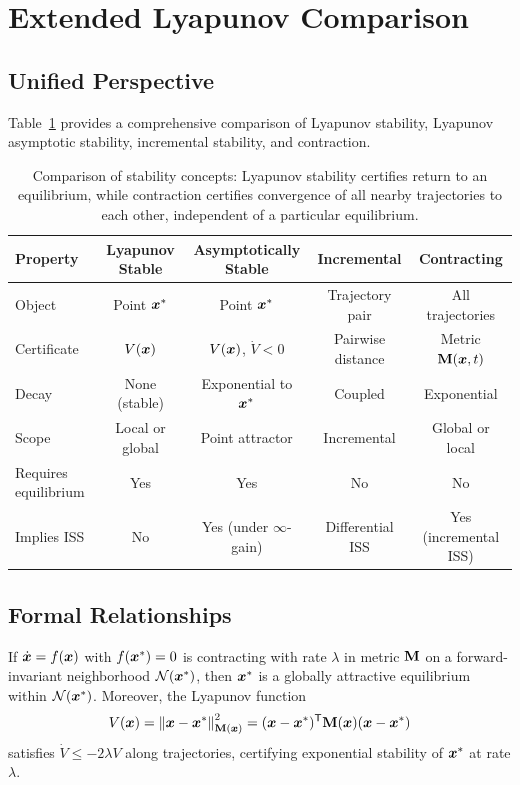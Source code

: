 \section{Extended Lyapunov Comparison}

\subsection{Unified Perspective}

Table~\ref{tbl:ch4:lyapunov-contraction} provides a comprehensive comparison of Lyapunov
stability, Lyapunov asymptotic stability, incremental stability, and contraction.

\begin{table}[h!]
\centering
\small
\begin{tabular}{@{}lcccc@{}}
\toprule
\textbf{Property} & \textbf{Lyapunov Stable} & \textbf{Asymptotically Stable} & \textbf{Incremental} & \textbf{Contracting} \\
\midrule
Object & Point $\bm{x}^*$ & Point $\bm{x}^*$ & Trajectory pair & All trajectories \\
Certificate & $V(\bm{x})$ & $V(\bm{x})$, $\dot{V} < 0$ & Pairwise distance & Metric $\mathbf{M}(\bm{x},t)$ \\
Decay & None (stable) & Exponential to $\bm{x}^*$ & Coupled & Exponential \\
Scope & Local or global & Point attractor & Incremental & Global or local \\
Requires equilibrium & Yes & Yes & No & No \\
Implies ISS & No & Yes (under $\infty$-gain) & Differential ISS & Yes (incremental ISS) \\
\bottomrule
\end{tabular}
\caption{Comparison of stability concepts: Lyapunov stability certifies return to an
equilibrium, while contraction certifies convergence of all nearby trajectories to
each other, independent of a particular equilibrium.}
\label{tbl:ch4:lyapunov-contraction}
\end{table}

\subsection{Formal Relationships}

\begin{proposition}
\label{prop:ch4:contraction-lyapunov}
If $\dot{\bm{x}} = f(\bm{x})$ with $f(\bm{x}^*) = 0$ is contracting with rate $\lambda$ in metric $\mathbf{M}$
on a forward-invariant neighborhood $\mathcal{N}(\bm{x}^*)$, then $\bm{x}^*$ is a globally attractive
equilibrium within $\mathcal{N}(\bm{x}^*)$. Moreover, the Lyapunov function
\begin{equation}
V(\bm{x}) = \left\lVert \bm{x} - \bm{x}^* \right\rVert_{\mathbf{M}(\bm{x})}^2 = (\bm{x}-\bm{x}^*)^{\mathsf{T}} \mathbf{M}(\bm{x})(\bm{x}-\bm{x}^*)
\label{eq:ch4:induced-lyapunov}
\end{equation}
satisfies $\dot{V} \leq -2\lambda V$ along trajectories, certifying exponential stability
of $\bm{x}^*$ at rate $\lambda$.
\end{proposition}

